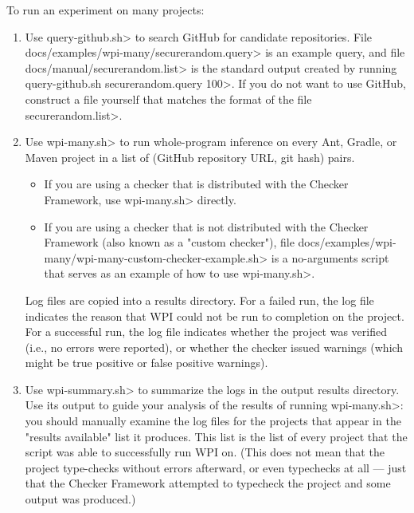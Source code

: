 To run an experiment on many projects:
\begin{enumerate}
\item Use \<query-github.sh> to search GitHub for candidate repositories.
File \<docs/examples/wpi-many/securerandom.query> is an example query, and file
\<docs/manual/securerandom.list> is the standard output
created by running \<query-github.sh securerandom.query 100>. If you do
not want to use GitHub, construct a file yourself that matches the format of
the file \<securerandom.list>.

\item Use \<wpi-many.sh> to run whole-program inference on every
Ant, Gradle, or Maven project in a list of (GitHub repository URL, git hash)
pairs.
\begin{itemize}
\item If you are using a checker that is distributed with the Checker
Framework, use \<wpi-many.sh> directly.
\item If you are using a checker that is not distributed with the Checker
Framework (also known as a "custom checker"), file
\<docs/examples/wpi-many/wpi-many-custom-checker-example.sh> is a no-arguments
script that serves as an example of how to use \<wpi-many.sh>.
\end{itemize}

Log files are copied into a results directory.
For a failed run, the log file indicates the reason that WPI could not
be run to completion on the project.
For a successful run, the log file indicates whether the project was verified
(i.e., no errors were reported), or whether the checker issued warnings
(which might be true positive or false positive warnings).

\item Use \<wpi-summary.sh> to summarize the logs in the output results directory.
Use its output to guide your analysis of the results of running \<wpi-many.sh>:
you should manually examine the log files for the projects that appear in the
"results available" list it produces. This list is the list of every project
that the script was able to successfully run WPI on.  (This does not mean
that the project type-checks without errors afterward, or even typechecks at
all --- just that the Checker Framework attempted to typecheck the project and
some output was produced.)


\end{enumerate}
